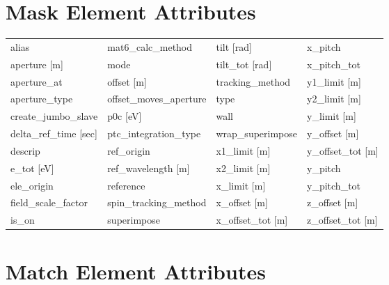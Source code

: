  \section{Mask Element Attributes}
 \label{s:list.mask}
 
 \begin{tabular}{llll} \toprule
alias                            & mat6_calc_method                 & tilt [rad]                       & x_pitch                          \\
aperture [m]                     & mode                             & tilt_tot [rad]                   & x_pitch_tot                      \\
aperture_at                      & offset [m]                       & tracking_method                  & y1_limit [m]                     \\
aperture_type                    & offset_moves_aperture            & type                             & y2_limit [m]                     \\
create_jumbo_slave               & p0c [eV]                         & wall                             & y_limit [m]                      \\
delta_ref_time [sec]             & ptc_integration_type             & wrap_superimpose                 & y_offset [m]                     \\
descrip                          & ref_origin                       & x1_limit [m]                     & y_offset_tot [m]                 \\
e_tot [eV]                       & ref_wavelength [m]               & x2_limit [m]                     & y_pitch                          \\
ele_origin                       & reference                        & x_limit [m]                      & y_pitch_tot                      \\
field_scale_factor               & spin_tracking_method             & x_offset [m]                     & z_offset [m]                     \\
is_on                            & superimpose                      & x_offset_tot [m]                 & z_offset_tot [m]                 \\
 \bottomrule
 \end{tabular}
 \vfill
 
 \section{Match Element Attributes}
 \label{s:list.match}
 
